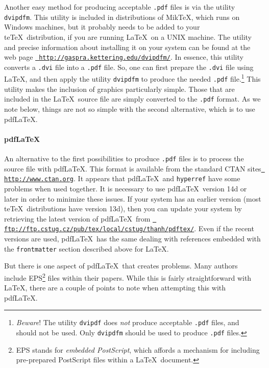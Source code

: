 \documentclass{endm}
\begin{document}
Another easy method for producing acceptable \texttt{.pdf} files is
via the utility \texttt{dvipdfm}. This utility is included in
distributions of Mik\TeX, which runs on Windows machines, but it
probably needs to be added to your te\TeX\ distribution, if you are
running \LaTeX\ on a UNIX machine. The utility and precise information
about installing it on your system can be found at the web page
\href{http://gaspra.kettering.edu/dvipdfm/}{\tt
http://gaspra.kettering.edu/dvipdfm/}. In essence, this utility
converts a \texttt{.dvi} file into a \texttt{.pdf} file. So, one can
first prepare the \texttt{.dvi} file using \LaTeX, and then apply the
utility \texttt{dvipdfm} to produce the needed \texttt{.pdf}
file.\footnote{ \emph{Beware}! The utility \texttt{dvipdf} does
\emph{not} produce acceptable \texttt{.pdf} files, and should not be
used. Only \texttt{dvipdfm} should be used to produce \texttt{.pdf}
files.} This utility makes the inclusion of graphics particularly
simple. Those that are included in the \LaTeX\ source file are simply
converted to the \texttt{.pdf} format. As we note below, things are
not so simple with the second alternative, which is to use pdf\LaTeX.

\paragraph{pdf\LaTeX}
An alternative to the first possibilities to produce \texttt{.pdf}
files is to process the source file with pdf\LaTeX. This format is
available from the standard CTAN sites \href{http://www.ctan.org}{\tt
http://www.ctan.org}. It appears that pdf\LaTeX\ and \texttt{hyperref}
have some problems when used together. It is necessary to use
pdf\LaTeX\ version 14d or later in order to minimize these issues. If
your system has an earlier version (most te\TeX\ distributions have
version 13d), then you can update your system by retrieving the latest
version of pdf\LaTeX\ from
\href{ftp://ftp.cstug.cz/pub/tex/local/cstug/thanh/pdftex/}{\tt
ftp://ftp.cstug.cz/pub/tex/local/cstug/thanh/pdftex/}. Even if the
recent versions are used, pdf\LaTeX\ has the same dealing with
references embedded with the \texttt{frontmatter} section described
above for \LaTeX.

But there is one aspect of pdf\LaTeX\ that creates problems. Many
authors include EPS\footnote{EPS stands for \emph{embedded PostScript},
which affords a mechanism for including pre-prepared PostScript files
within a \LaTeX\ document.} files within their papers. While this is
fairly straightforward with \LaTeX, there are a couple of points to
note when attempting this with pdf\LaTeX.
\end{document}
